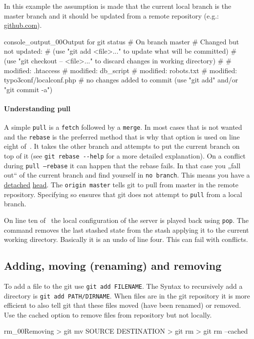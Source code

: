In this example the assumption is made that the current local branch is the master branch and it should be updated from a remote repository (e.g.: \href{https://github.com/}{github.com}).
\begin{codelisting}{console_output_00}{Output for git status}
# On branch master
# Changed but not updated:
#   (use "git add <file>..." to update what will be committed)
#   (use "git checkout -- <file>..." to discard changes in working directory)
#
#       modified:   .htaccess
#       modified:   db_script
#       modified:   robots.txt
#       modified:   typo3conf/localconf.php
#
no changes added to commit (use "git add" and/or "git commit -a")
\end{codelisting}
\paragraph{Understanding pull}
A simple \texttt{pull} is a \texttt{fetch} followed by a \texttt{merge}. In most cases that is not wanted and the \texttt{rebase} is the preferred method that is why that option is used on line eight of~. It takes the other branch and attempts to put the current branch on top of it (see \texttt{git rebase -{}-help} for a more detailed explanation). On a conflict during \texttt{pull --rebase} it can happen that the rebase fails. In that case you „fall out“ of the current branch and find yourself in \texttt{no branch}. This means you have a \href{http://www.kernel.org/pub/software/scm/git/docs/git-checkout.html#_detached_head}{detached} \href{http://sitaramc.github.com/concepts/detached-head.html}{head}. The \texttt{origin master} tells git to pull from master in the remote repository. Specifying so ensures that git does not attempt to \texttt{pull} from a local branch.

On line ten of~ the local configuration of the server is played back using \texttt{pop}. The command removes the last stashed state from the stash applying it to the current working directory. Basically it is an undo of line four. This can fail with conflicts.
\subsection{Adding, moving (renaming) and removing}
To add a file to the git use \texttt{git add FILENAME}. The Syntax to recursively add a directory is \texttt{git add PATH/DIRNAME}. When files are in the git repository it is more efficient to also tell git that these files moved (have been renamed) or removed. Use the cached option to remove files from repository but not locally.
\begin{codelisting}{rm_00}{Removing}
> git mv SOURCE DESTINATION
> git rm
> git rm --cached
\end{codelisting}
